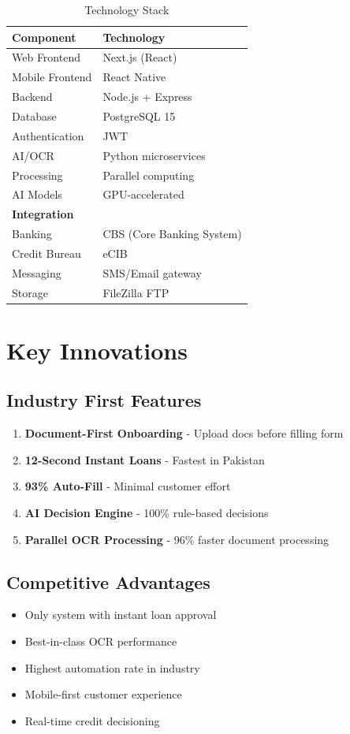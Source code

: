 \documentclass[11pt,a4paper]{article}
\begin{document}
\begin{table}[h]
\centering
\begin{tabular}{@{}ll@{}}
\toprule
\textbf{Component} & \textbf{Technology} \\ \midrule
Web Frontend & Next.js (React) \\
Mobile Frontend & React Native \\
Backend & Node.js + Express \\
Database & PostgreSQL 15 \\
Authentication & JWT \\
AI/OCR & Python microservices \\
Processing & Parallel computing \\
AI Models & GPU-accelerated \\ \midrule
\textbf{Integration} & \\
Banking & CBS (Core Banking System) \\
Credit Bureau & eCIB \\
Messaging & SMS/Email gateway \\
Storage & FileZilla FTP \\ \bottomrule
\end{tabular}
\caption{Technology Stack}
\end{table}

\newpage

\section{Key Innovations}

\subsection{Industry First Features}
\begin{enumerate}
    \item \textbf{Document-First Onboarding} - Upload docs before filling form
    \item \textbf{12-Second Instant Loans} - Fastest in Pakistan
    \item \textbf{93\% Auto-Fill} - Minimal customer effort
    \item \textbf{AI Decision Engine} - 100\% rule-based decisions
    \item \textbf{Parallel OCR Processing} - 96\% faster document processing
\end{enumerate}

\subsection{Competitive Advantages}
\begin{itemize}[leftmargin=*]
    \item Only system with instant loan approval
    \item Best-in-class OCR performance
    \item Highest automation rate in industry
    \item Mobile-first customer experience
    \item Real-time credit decisioning
\end{itemize}
\end{document}
